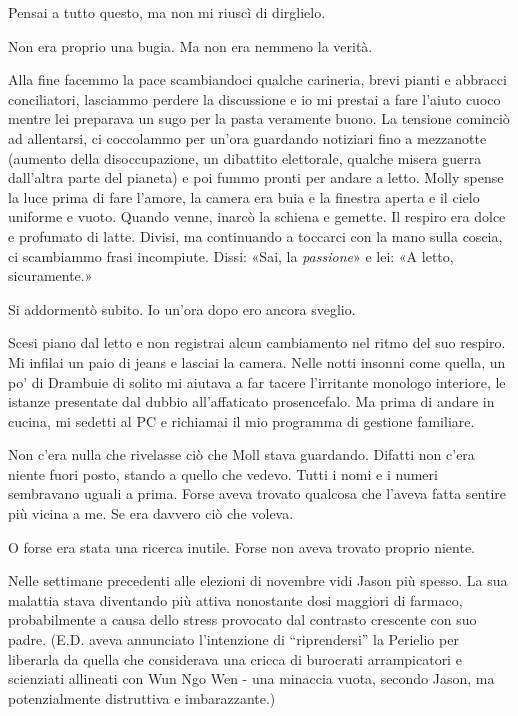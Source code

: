 Pensai a tutto questo, ma non mi riuscì di dirglielo.

Non era proprio una bugia. Ma non era nemmeno la verità.

Alla fine facemmo la pace scambiandoci qualche carineria, brevi pianti e
abbracci conciliatori, lasciammo perdere la discussione e io mi prestai
a fare l'aiuto cuoco mentre lei preparava un sugo per la pasta veramente
buono. La tensione cominciò ad allentarsi, ci coccolammo per un'ora
guardando notiziari fino a mezzanotte (aumento della disoccupazione, un
dibattito elettorale, qualche misera guerra dall'altra parte del
pianeta) e poi fummo pronti per andare a letto. Molly spense la luce
prima di fare l'amore, la camera era buia e la finestra aperta e il
cielo uniforme e vuoto. Quando venne, inarcò la schiena e gemette. Il
respiro era dolce e profumato di latte. Divisi, ma continuando a
toccarci con la mano sulla coscia, ci scambiammo frasi incompiute.
Dissi: «Sai, la \emph{passione}» e lei: «A letto, sicuramente.»

Si addormentò subito. Io un'ora dopo ero ancora sveglio.

Scesi piano dal letto e non registrai alcun cambiamento nel ritmo del
suo respiro. Mi infilai un paio di jeans e lasciai la camera. Nelle
notti insonni come quella, un po' di Drambuie di solito mi aiutava a far
tacere l'irritante monologo interiore, le istanze presentate dal dubbio
all'affaticato prosencefalo. Ma prima di andare in cucina, mi sedetti al
PC e richiamai il mio programma di gestione familiare.

Non c'era nulla che rivelasse ciò che Moll stava guardando. Difatti non
c'era niente fuori posto, stando a quello che vedevo. Tutti i nomi e i
numeri sembravano uguali a prima. Forse aveva trovato qualcosa che
l'aveva fatta sentire più vicina a me. Se era davvero ciò che voleva.

O forse era stata una ricerca inutile. Forse non aveva trovato proprio
niente.

\separatorefiori

Nelle settimane precedenti alle elezioni di novembre vidi Jason più
spesso. La sua malattia stava diventando più attiva nonostante dosi
maggiori di farmaco, probabilmente a causa dello stress provocato dal
contrasto crescente con suo padre. (E.D. aveva annunciato l'intenzione
di ``riprendersi'' la Perielio per liberarla da quella che considerava
una cricca di burocrati arrampicatori e scienziati allineati con Wun Ngo
Wen - una minaccia vuota, secondo Jason, ma potenzialmente distruttiva e
imbarazzante.)

